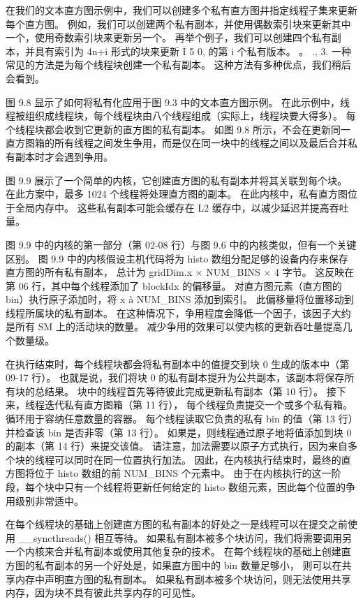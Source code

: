 在我们的文本直方图示例中，我们可以创建多个私有直方图并指定线程子集来更新每个直方图。 
例如，我们可以创建两个私有副本，并使用偶数索引块来更新其中一个，使用奇数索引块来更新另一个。 
再举个例子，我们可以创建四个私有副本，并具有索引为 4n+i 形式的块来更新 I 5 0, 的第 i 个私有版本。 。 ., 3. 
一种常见的方法是为每个线程块创建一个私有副本。 这种方法有多种优点，我们稍后会看到。

图 9.8 显示了如何将私有化应用于图 9.3 中的文本直方图示例。 
在此示例中，线程被组织成线程块，每个线程块由八个线程组成（实际上，线程块要大得多）。 
每个线程块都会收到它更新的直方图的私有副本。 
如图 9.8 所示，不会在更新同一直方图箱的所有线程之间发生争用，而是仅在同一块中的线程之间以及最后合并私有副本时才会遇到争用。

图 9.9 展示了一个简单的内核，它创建直方图的私有副本并将其关联到每个块。 在此方案中，最多 1024 个线程将处理直方图的副本。 
在此内核中，私有直方图位于全局内存中。 这些私有副本可能会缓存在 L2 缓存中，以减少延迟并提高吞吐量。

图 9.9 中的内核的第一部分（第 02-08 行）与图 9.6 中的内核类似，但有一个关键区别。 
图 9.9 中的内核假设主机代码将为 histo 数组分配足够的设备内存来保存直方图的所有私有副本，
总计为 gridDim.x × NUM\_BINS × 4 字节。 这反映在第 06 行，其中每个线程添加了 blockIdx 的偏移量。 
对直方图元素（直方图的 bin）执行原子添加时，将 x à NUM\_BINS 添加到索引。 
此偏移量将位置移动到线程所属块的私有副本。 在这种情况下，争用程度会降低一个因子，该因子大约是所有 SM 上的活动块的数量。 
减少争用的效果可以使内核的更新吞吐量提高几个数量级。

在执行结束时，每个线程块都会将私有副本中的值提交到块 0 生成的版本中（第 09-17 行）。 
也就是说，我们将块 0 的私有副本提升为公共副本，该副本将保存所有块的总结果。 
块中的线程首先等待彼此完成更新私有副本（第 10 行）。 接下来，线程迭代私有直方图箱（第 11 行），
每个线程负责提交一个或多个私有箱。 循环用于容纳任意数量的容器。 
每个线程读取它负责的私有 bin 的值（第 13 行）并检查该 bin 是否非零（第 13 行）。 
如果是，则线程通过原子地将值添加到块 0 的副本（第 14 行）来提交该值。 
请注意，加法需要以原子方式执行，因为来自多个块的线程可以同时在同一位置执行加法。 
因此，在内核执行结束时，最终的直方图将位于 histo 数组的前 NUM\_BINS 个元素中。 
由于在内核执行的这一阶段，每个块中只有一个线程将更新任何给定的 histo 数组元素，因此每个位置的争用级别非常适中。

在每个线程块的基础上创建直方图的私有副本的好处之一是线程可以在提交之前使用 \_\_syncthreads() 相互等待。 
如果私有副本被多个块访问，我们将需要调用另一个内核来合并私有副本或使用其他复杂的技术。 
在每个线程块的基础上创建直方图的私有副本的另一个好处是，如果直方图中的 bin 数量足够小，
则可以在共享内存中声明直方图的私有副本。 如果私有副本被多个块访问，则无法使用共享内存，因为块不具有彼此共享内存的可见性。

